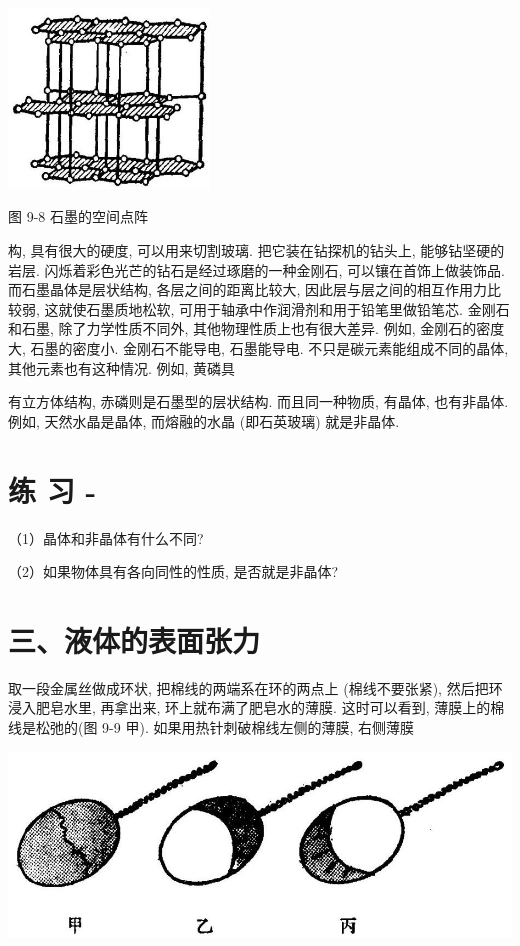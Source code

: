 \documentclass[10pt]{article}
\begin{document}
\begin{center}
\includegraphics[max width=0.4\textwidth]{images/01912d55-147c-70aa-b0e0-1782a122f948_264_980503.jpg}
\end{center}

图 9-8 石墨的空间点阵

构, 具有很大的硬度, 可以用来切割玻璃. 把它装在钻探机的钻头上, 能够钻坚硬的岩层. 闪烁着彩色光芒的钻石是经过琢磨的一种金刚石, 可以镶在首饰上做装饰品. 而石墨晶体是层状结构, 各层之间的距离比较大, 因此层与层之间的相互作用力比较弱, 这就使石墨质地松软, 可用于轴承中作润滑剂和用于铅笔里做铅笔芯. 金刚石和石墨, 除了力学性质不同外, 其他物理性质上也有很大差异. 例如, 金刚石的密度大, 石墨的密度小. 金刚石不能导电, 石墨能导电. 不只是碳元素能组成不同的晶体, 其他元素也有这种情况. 例如, 黄磷具

有立方体结构, 赤磷则是石墨型的层状结构. 而且同一种物质, 有晶体, 也有非晶体. 例如, 天然水晶是晶体, 而熔融的水晶 (即石英玻璃) 就是非晶体.

\section*{练 习 -}

（1）晶体和非晶体有什么不同?

（2）如果物体具有各向同性的性质, 是否就是非晶体?

\section*{三、液体的表面张力}

取一段金属丝做成环状, 把棉线的两端系在环的两点上 (棉线不要张紧), 然后把环浸入肥皂水里, 再拿出来, 环上就布满了肥皂水的薄膜. 这时可以看到, 薄膜上的棉线是松弛的(图 9-9 甲). 如果用热针刺破棉线左侧的薄膜, 右侧薄膜

\begin{center}
\includegraphics[max width=1.0\textwidth]{images/01912d55-147c-70aa-b0e0-1782a122f948_265_867627.jpg}
\end{center}
\end{document}
